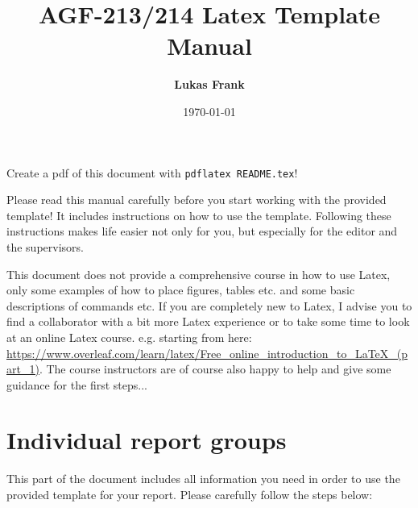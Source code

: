 \documentclass[11pt,a4paper]{article}
\author{\Large \textbf{Lukas Frank}}
\title{\Huge \textbf{AGF-213/214 Latex Template Manual}}
\date{\today}
\begin{document}
\maketitle

Create a pdf of this document with \texttt{pdflatex README.tex}!

Please read this manual carefully before you start working with the provided template! It includes instructions on how to use the template. Following these instructions makes life easier not only for you, but especially for the editor and the supervisors.

This document does not provide a comprehensive course in how to use Latex, only some examples of how to place figures, tables etc. and some basic descriptions of commands etc. If you are completely new to Latex, I advise you to find a collaborator with a bit more Latex experience or to take some time to look at an online Latex course. e.g. starting from here: \url{https://www.overleaf.com/learn/latex/Free_online_introduction_to_LaTeX_(part_1)}. The course instructors are of course also happy to help and give some guidance for the first steps...

\section{Individual report groups}
This part of the document includes all information you need in order to use the provided template for your report. Please carefully follow the steps below:
\end{document}
